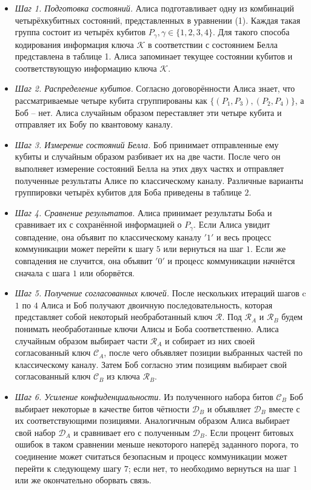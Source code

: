 \documentclass[a4paper,11pt]{article}
\begin{document}
\begin{itemize}

\item \textit{Шаг 1. Подготовка состояний.} Алиса подготавливает одну из комбинаций четырёхкубитных состояний, представленных в уравнении (1). Каждая такая группа состоит из четырёх кубитов $P_\gamma, \gamma \in \{1,2,3,4\}$. Для такого способа кодирования информация ключа $\mathcal{K}$ в соответствии с состоянием Белла представлена в таблице 1. Алиса запоминает текущее состоянии кубитов и соответствующую информацию ключа $\mathcal{K}$.

\item \textit{Шаг 2. Распределение кубитов.} Согласно договорённости Алиса знает, что рассматриваемые четыре кубита сгруппированы как $\{(P_1, P_3), (P_2, P_4)\}$, а Боб -- нет. Алиса случайным образом переставляет эти четыре кубита и отправляет их Бобу по квантовому каналу.

\item \textit{Шаг 3. Измерение состояний Белла.} Боб принимает отправленные ему кубиты и случайным образом разбивает их на две части. После чего он выполняет измерение состояний Белла на этих двух частях и отправляет полученные результаты Алисе по классическому каналу. Различные варианты группировки четырёх кубитов для Боба приведены в таблице $2$.

\item \textit{Шаг 4. Сравнение результатов.} Алиса принимает результаты Боба и сравнивает их с сохранённой информацией о $P_\gamma$. Если Алиса увидит совпадение, она объявит по классическому каналу $'1'$ и весь процесс коммуникации может перейти к шагу $5$ или вернуться на шаг $1$. Если же совпадения не случится, она объявит $'0'$ и процесс коммуникации начнётся сначала с шага $1$ или оборвётся. 

\item \textit{Шаг 5. Получение согласованных ключей.} После нескольких итераций шагов c $1$ по $4$ Алиса и Боб получают двоичную последовательность, которая представляет собой некоторый необработанный ключ $\mathcal{R}$. Под $\mathcal{R}_A$ и $\mathcal{R}_B$ будем понимать необработанные ключи Алисы и Боба соответственно. Алиса случайным образом выбирает части $\mathcal{R}_A$ и собирает из них своей согласованный ключ $\mathcal{C}_A$, после чего объявляет позиции выбранных частей по классическому каналу. Затем Боб согласно этим позициям выбирает свой согласованный ключ $\mathcal{C}_B$ из ключа $\mathcal{R}_B$.

\item \textit{Шаг 6. Усиление конфиденциальности.} Из полученного набора битов $\mathcal{C}_B$ Боб выбирает некоторые в качестве битов чётности $\mathcal{D}_B$ и объявляет $\mathcal{D}_B$ вместе с их соответствующими позициями. Аналогичным образом Алиса выбирает свой набор $\mathcal{D}_A$ и сравнивает его с полученным $\mathcal{D}_B$. Если процент битовых ошибок в таком сравнении меньше некоторого наперёд заданного порога, то соединение может считаться безопасным и процесс коммуникации может перейти к следующему шагу $7$; если нет, то необходимо вернуться на шаг $1$ или же окончательно оборвать связь.


\end{itemize}
\end{document}
